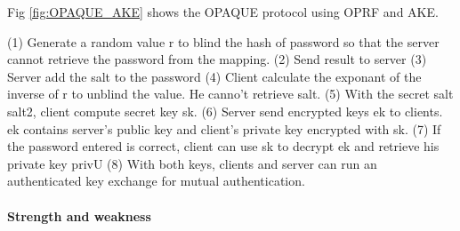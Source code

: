 \documentclass[../report.tex]{subfiles}
\begin{document}
Fig \ref{fig:OPAQUE_AKE} shows the OPAQUE protocol using OPRF and AKE.

(1) Generate a random value r to blind the hash of password so that the server cannot retrieve the password from the mapping.
(2) Send result to server
(3) Server add the salt to the password
(4) Client calculate the exponant of the inverse of r to unblind the value. He canno't retrieve salt.
(5) With the secret salt salt2, client compute secret key sk.
(6) Server send encrypted keys ek to clients. ek contains server's public key and client's private key encrypted with sk.
(7) If the password entered is correct, client can use sk to decrypt ek and retrieve his private key privU
(8) With both keys, clients and server can run an authenticated key exchange for mutual authentication.




\paragraph{Strength and weakness}
\end{document}
